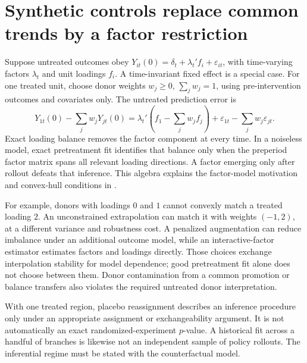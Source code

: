 \section{Synthetic controls replace common trends by a factor restriction}
\label{r3:synthetic-control}
Suppose untreated outcomes obey
$Y_{it}(0)=\delta_t+\lambda_t' f_i+\varepsilon_{it}$, with
time-varying factors $\lambda_t$ and unit loadings $f_i$. A
time-invariant fixed effect is a special case. For one treated unit,
choose donor weights $w_j\ge0$, $\sum_jw_j=1$, using pre-intervention
outcomes and covariates only. The untreated prediction error is
\begin{equation}
 Y_{1t}(0)-\sum_jw_jY_{jt}(0)
 =\lambda_t'\!\left(f_1-\sum_jw_jf_j\right)
                 +\varepsilon_{1t}-\sum_jw_j\varepsilon_{jt}.
 \label{r3:synth-error}
\end{equation}
Exact loading balance removes the factor component at every time.
In a noiseless model, exact pretreatment fit identifies that balance
only when the preperiod factor matrix spans all relevant loading
directions. A factor emerging only after rollout defeats that inference.
This algebra explains the factor-model motivation and convex-hull
conditions in \citet[Section 2.2 and Appendix B]{abadie2010}.

For example, donors with loadings $0$ and $1$ cannot convexly match a
treated loading $2$. An unconstrained extrapolation can match it with
weights $(-1,2)$, at a different variance and robustness cost. A
penalized augmentation can reduce imbalance under an additional
outcome model, while an interactive-factor estimator estimates factors
and loadings directly. Those choices exchange interpolation stability
for model dependence; good pretreatment fit alone does not choose
between them. Donor contamination from a common promotion or balance
transfers also violates the required untreated donor interpretation.

With one treated region, placebo reassignment describes an inference
procedure only under an appropriate assignment or exchangeability
argument. It is not automatically an exact randomized-experiment
$p$-value. A historical fit across a handful of branches is likewise
not an independent sample of policy rollouts. The inferential regime
must be stated with the counterfactual model.

